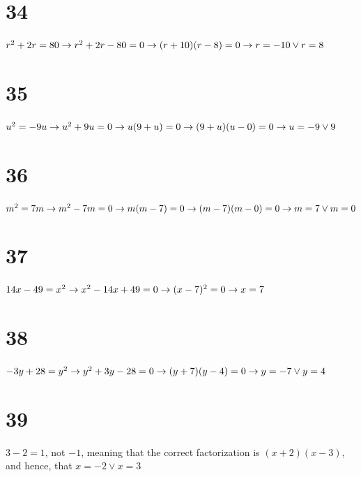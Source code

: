 \documentclass{article}
\theoremstyle{definition}
\begin{document}
\section*{34}
$r^2+2r=80\newline\rightarrow r^2+2r-80=0\newline\rightarrow (r+10)(r-8)=0\newline\rightarrow r=-10\vee r=8$

\section*{35}
$u^2=-9u\newline\rightarrow u^2+9u=0\newline\rightarrow u(9+u)=0\newline\rightarrow (9+u)(u-0)=0\newline\rightarrow u=-9\vee 9$

\section*{36}
$m^2=7m\newline\rightarrow m^2-7m=0\newline\rightarrow m(m-7)=0\newline\rightarrow (m-7)(m-0)=0\newline\rightarrow m=7\vee m=0$

\section*{37}
$14x-49=x^2\newline\rightarrow x^2-14x+49=0\newline\rightarrow (x-7)^2=0\newline\rightarrow x=7$

\section*{38}
$-3y+28=y^2\newline\rightarrow y^2+3y-28=0\newline\rightarrow (y+7)(y-4)=0\newline\rightarrow y=-7\vee y=4$

\section*{39}
$3-2=1$, not $-1$, meaning that the correct factorization is $(x+2)(x-3)$, and hence, that $x=-2\vee x=3$
\end{document}
